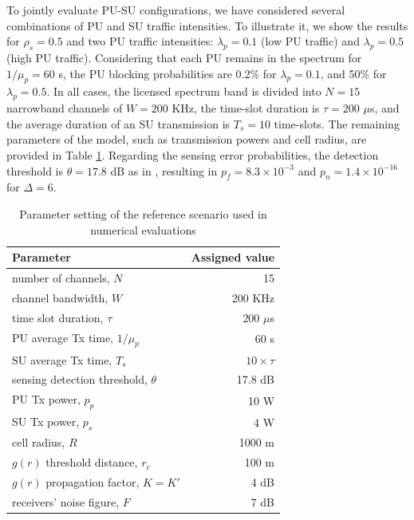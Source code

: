 To jointly evaluate PU-SU configurations, we have considered several combinations of PU and SU traffic intensities. To illustrate it, we show the results for $\rho_{s}=0.5$ and two PU traffic intensities: $\lambda_{p}=0.1$ (low PU traffic) and $\lambda_{p}=0.5$ (high PU traffic). Considering that each PU remains in the spectrum for $1/\mu_{p}=60$ s, the PU blocking probabilities are 0.2\% for $\lambda_{p}=0.1$, and 50\% for $\lambda_{p}=0.5$.  
In all cases, the licensed spectrum band is divided into $N=15$ narrowband channels of $W=200$ KHz, the time-slot duration is $\tau=200$ $\mu$s, and the average duration of an SU transmission is $T_{s}=10$ time-slots. The remaining parameters of the model, such as transmission powers and cell radius, are provided in Table \ref{BR_table_sim_param}. 
Regarding the sensing error probabilities, the detection threshold is $\theta=17.8$ dB as in \cite{ref:Pawelczak2009}, resulting in $p_{f}=8.3\times10^{-3}$ and $p_{n}=1.4\times10^{-16}$ for $\Delta=6$.

\begin{table}
\begin{tabular}{lr} \hline
\textbf{Parameter} & \textbf{Assigned value}\\\hline
number of channels, $N$&15\\
channel bandwidth, $W$&200 KHz\\
time slot duration, $\tau$&200 $\mu$s\\
PU average Tx time, $1/\mu_{p}$&60 s\\
SU average Tx time, $T_{s}$&$10\times\tau$\\
sensing detection threshold, $\theta$&17.8 dB\\
PU Tx power, $p_{p}$&10 W\\
SU Tx power, $p_{s}$&4 W\\
cell radius, $R$ &1000 m\\
$g(r)$ threshold distance, $r_{c}$&100 m\\
$g(r)$ propagation factor, $K=K'$&4 dB\\
receivers' noise figure, $F$&7 dB\\\hline
\end{tabular}
\centering
\caption{Parameter setting of the reference scenario used in numerical evaluations}
\label{BR_table_sim_param}
\end{table}

